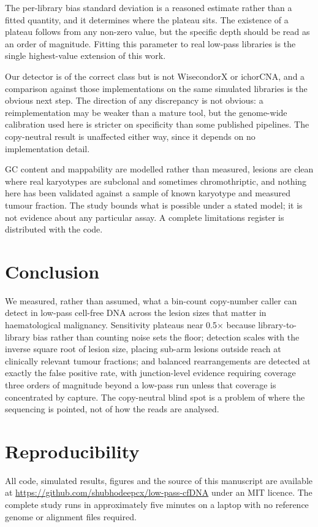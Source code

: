 \documentclass[conference]{IEEEtran}
\begin{document}
The per-library bias standard deviation is a reasoned estimate rather than a
fitted quantity, and it determines where the plateau sits. The existence of a
plateau follows from any non-zero value, but the specific depth should be read
as an order of magnitude. Fitting this parameter to real low-pass libraries is
the single highest-value extension of this work.

Our detector is of the correct class but is not WisecondorX or ichorCNA, and a
comparison against those implementations on the same simulated libraries is the
obvious next step. The direction of any discrepancy is not obvious: a
reimplementation may be weaker than a mature tool, but the genome-wide
calibration used here is stricter on specificity than some published pipelines.
The copy-neutral result is unaffected either way, since it depends on no
implementation detail.

GC content and mappability are modelled rather than measured, lesions are clean
where real karyotypes are subclonal and sometimes chromothriptic, and nothing
here has been validated against a sample of known karyotype and measured tumour
fraction. The study bounds what is possible under a stated model; it is not
evidence about any particular assay. A complete limitations register is
distributed with the code.

\section{Conclusion}

We measured, rather than assumed, what a bin-count copy-number caller can
detect in low-pass cell-free DNA across the lesion sizes that matter in
haematological malignancy. Sensitivity plateaus near 0.5$\times$ because
library-to-library bias rather than counting noise sets the floor; detection
scales with the inverse square root of lesion size, placing sub-arm lesions
outside reach at clinically relevant tumour fractions; and balanced
rearrangements are detected at exactly the false positive rate, with
junction-level evidence requiring coverage three orders of magnitude beyond a
low-pass run unless that coverage is concentrated by capture. The copy-neutral
blind spot is a problem of where the sequencing is pointed, not of how the
reads are analysed.

\section*{Reproducibility}

All code, simulated results, figures and the source of this manuscript are
available at \url{https://github.com/shubhodeepcx/low-pass-cfDNA} under an MIT
licence. The complete study runs in approximately five minutes on a laptop with
no reference genome or alignment files required.



\end{document}
